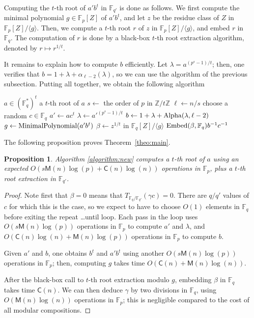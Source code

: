 \documentclass[12pt]{article}
\theoremstyle{plain}
\newtheorem{proposition}[theorem]{Proposition}
\theoremstyle{definition}
\newcommand{\refalgorithm}[1]{Algorithm \ref{#1}}
\def\F{\mathbb{F}}
\def\M{\mathsf{M}}
\def\CC{\mathsf{C}}
\newcounter{algorithm}
\begin{document}
Computing the $t$-th root of $a'b^t$ in $\F_{q'}$ is done as follows.
We first compute the minimal polynomial $g\in\F_p[Z]$ of $a'b^t$, and
let $z$ be the residue class of $Z$ in $\F_p[Z]/\langle g \rangle$.
Then, we compute a $t$-th root $r$ of $z$ in $\F_p[Z]/\langle g \rangle$, and
embed $r$ in $\F_q$. The computation of $r$ is done by a black-box
$t$-th root extraction algorithm, denoted by $r \mapsto r^{1/t}$.

It remains to explain how to compute $b$ efficiently. Let $\lambda =
a^{(p^s - 1) / t}$; then, one verifies that $b = 1 + \lambda +
\alpha_{\ell - 2}(\lambda)$, so we can use the algorithm of the
previous subsection. Putting all together, we obtain the following
algorithm

\begin{algorithm}
[$t$-th root in $\F_q^*$]
\label{algorithm:new}
\begin{algorithmic}[1]
\REQUIRE $a \in (\F_q^*)^t$
\ENSURE a $t$-th root of $a$
\STATE $s \leftarrow $ the order of $p$ in $\mathbb{Z}/t\mathbb{Z}$
\STATE $\ell \leftarrow n / s$
\REPEAT
\STATE choose a random $c \in \F_q$
\STATE $a'\leftarrow ac^t$
\STATE $\lambda \leftarrow {a'}^{(p^s-1)/t}$
\STATE $b \leftarrow 1+\lambda+{\rm Alpha}(\lambda,\ell-2)$
\STATE $g \leftarrow {\rm MinimalPolynomial}(a'b^t)$
\STATE $\beta \leftarrow z^{1/t}$ in $\F_q[Z]/\langle g\rangle$
\RETURN ${\rm Embed}(\beta,\F_q) b^{-1}c^{-1}$
\end{algorithmic}
\end{algorithm}

The following proposition proves Theorem~\ref{theo:main}.

\begin{proposition}
  \refalgorithm{algorithm:new} computes a $t$-th root of $a$ using an
  expected $O(s\M(n)\log(p) + \CC(n)\log(n))$ operations in $\F_p$,
  plus a $t$-th root extraction in $\F_{q'}$.
\end{proposition}
\begin{proof}
  Note first that $\beta=0$ means that $T_{\F_q / \F_{q'}}(\gamma
  c)=0$. There are $q/q'$ values of $c$ for which this is the case, so
  we expect to have to choose $O(1)$ elements in $\F_q$ before exiting
  the repeat \dots until loop. Each pass in the loop uses
  $O(s\M(n)\log(p))$ operations in $\F_p$ to compute $a'$ and
  $\lambda$, and $O(\CC(n)\log(n) + \M(n)\log(p))$ operations in $\F_p$
  to compute $b$.

  Given $a'$ and $b$, one obtains $b^t$ and $a'b^t$ using another
  $O(s\M(n)\log(p))$ operations in $\F_p$; then, computing $g$ takes
  time $O(\CC(n) + \M(n)\log(n))$. 

  After the black-box call to $t$-th root extraction modulo $g$,
  embedding $\beta$ in $\F_q$ takes time $\CC(n)$. We can then deduce
  $\gamma$ by two divisions in $\F_q$, using $O(\M(n)\log(n))$
  operations in $\F_p$; this is negligible compared to the cost of all
  modular compositions.
\end{proof}
\end{document}
